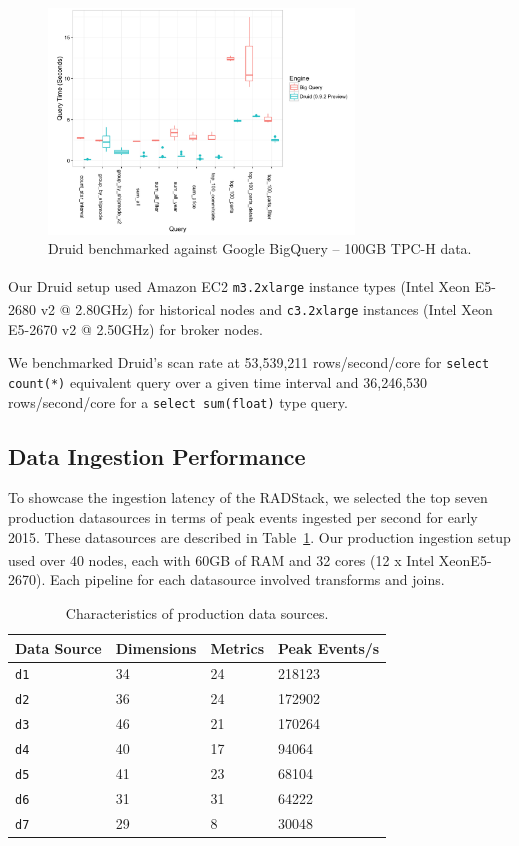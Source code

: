 \documentclass{vldb}
\begin{document}
\begin{figure}
\centering
\includegraphics[width = 3.2in]{druid_vs_bigquery}
\caption{Druid benchmarked against Google BigQuery -- 100GB TPC-H data.}
\label{fig:druid_vs_bigquery}
\end{figure}

Our Druid setup used Amazon EC2 \texttt{m3.2xlarge} instance types
(Intel\textsuperscript{\textregistered} Xeon\textsuperscript{\textregistered}
E5-2680 v2 @ 2.80GHz) for historical nodes and \texttt{c3.2xlarge} instances
(Intel\textsuperscript{\textregistered} Xeon\textsuperscript{\textregistered}
E5-2670 v2 @ 2.50GHz) for broker nodes. 

We benchmarked Druid's scan rate at 53,539,211
rows/second/core for \texttt{select count(*)} equivalent query over a given
time interval and 36,246,530 rows/second/core for a \texttt{select sum(float)}
type query.

\subsection{Data Ingestion Performance}
To showcase the ingestion latency of the RADStack, we selected the top seven
production datasources in terms of peak events ingested per second for early
2015. These datasources are described in Table~\ref{tab:ingestion}. Our
production ingestion setup used over 40 nodes, each with 60GB of RAM and 32
cores (12 x Intel\textsuperscript\textregistered
Xeon\textsuperscript\textregistered E5-2670). Each pipeline for each datasource
involved transforms and joins.

\begin{table}
  \centering
  \scriptsize\begin{tabular}{| l | l | l | l |}
    \hline
    \textbf{Data Source} & \textbf{Dimensions} & \textbf{Metrics} & \textbf{Peak Events/s} \\ \hline
    \texttt{d1} & 34 & 24 & 218123 \\ \hline
    \texttt{d2} & 36 & 24 & 172902 \\ \hline
    \texttt{d3} & 46 & 21 & 170264 \\ \hline
    \texttt{d4} & 40 & 17 & 94064 \\ \hline
    \texttt{d5} & 41 & 23 & 68104 \\ \hline
    \texttt{d6} & 31 & 31 & 64222 \\ \hline
    \texttt{d7} & 29 & 8 & 30048 \\ \hline
  \end{tabular}
  \normalsize
  \caption{Characteristics of production data sources.}
  \label{tab:ingestion}
\end{table}
\end{document}
